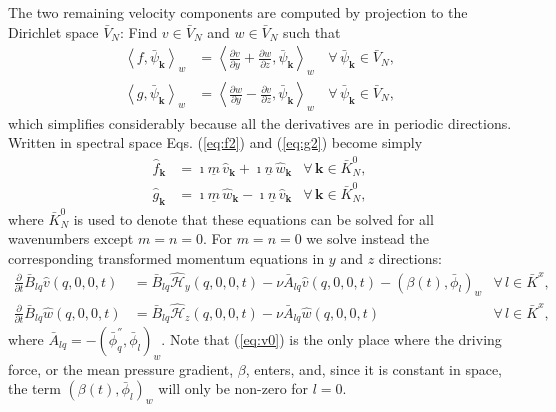 \documentclass[preprint]{elsarticle}
\newcommand{\D}[1]{\bar{#1}}
\begin{document}
The two remaining velocity components are computed by projection to the 
Dirichlet space $\D{V}_N$: Find 
${v} \in \D{V}_N$ and $w \in \D{V}_N$ such that
\begin{align}
\left<f, \D{\psi}_{\bm{k}}\right>_w &= \left<\frac{\partial v}{\partial y} + 
\frac{\partial w}{\partial z}, \D{\psi}_{\bm{k}}\right>_w \, &\forall \, \D{\psi}_{\bm{k}} \in 
\D{V}_N, \label{eq:f2} \\
\left<g, \D{\psi}_{\bm{k}}\right>_w &= \left<\frac{\partial w}{\partial y}  - 
\frac{\partial v}{\partial z}, \D{\psi}_{\bm{k}}\right>_w \, &\forall \, \D{\psi}_{\bm{k}} \in 
\D{V}_N, \label{eq:g2}
\end{align}
which simplifies considerably because all the derivatives are in periodic 
directions. Written in spectral space Eqs. (\ref{eq:f2}) and (\ref{eq:g2}) 
become simply
\begin{align}
\hat{f}_{\bm{k}} &= \imath \underline{m}\, \hat{v}_{\bm{k}} + \imath 
\underline{n}\, \hat{w}_{\bm{k}} &\forall \, \bm{k} \in \D{K}_N^0, \label{eq:f3} \\
\hat{g}_{\bm{k}} &= \imath \underline{m}\, \hat{w}_{\bm{k}} - \imath 
\underline{n}\, \hat{v}_{\bm{k}} & \forall \, \bm{k} \in \D{K}_N^0, \label{eq:g3}
\end{align}
where $\D{K}_N^0$ is used to denote that these equations can be solved for all 
wavenumbers except $m=n=0$. For $m=n=0$ we solve instead the 
corresponding transformed momentum equations in $y$ and $z$ directions:
\begin{align}
\frac{\partial }{\partial t} \D{B}_{lq}\hat{v}(q, 0, 0, t) &= 
\D{B}_{lq}\hat{\mathcal{H}}_y(q, 0, 0, t) - \nu \D{A}_{lq} \hat{v}(q, 0, 0, t) - \left(\beta(t), \D{\phi}_l \right)_w
& \forall\, l \in \D{K}^x, \label{eq:v0}\\
\frac{\partial }{\partial t} \D{B}_{lq}\hat{w}(q, 0, 0, t) &= 
\D{B}_{lq}\hat{\mathcal{H}}_z(q, 0, 0, t) - \nu \D{A}_{lq} \hat{w}(q, 0, 0, t) 
& \forall\, l \in \D{K}^x,\label{eq:w0}
\end{align}
where $\D{A}_{lq}=-(\D{\phi}_q^{''}, \D{\phi}_l )_w$. Note that (\ref{eq:v0}) is the only place where the driving force, or the mean pressure gradient, $\beta$, enters, and, since it is constant in space, the term $(\beta(t), \D{\phi}_l )_w$ will only be non-zero for $l=0$.
\end{document}

